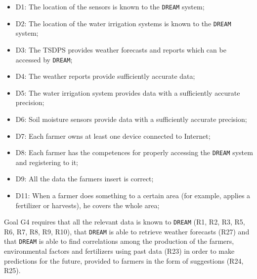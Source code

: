 \documentclass{article}
\begin{document}
\begin{itemize}
    \item D1: The location of the sensors is known to the \verb|DREAM| system;
    
    \item D2: The location of the water irrigation systems is known to the \verb|DREAM| system;
    
    \item D3: The TSDPS provides weather forecasts and reports which can be accessed by \verb|DREAM|;
    
    \item D4: The weather reports provide sufficiently accurate data;
    
    \item D5: The water irrigation system provides data with a sufficiently accurate precision;
    
    \item D6: Soil moisture sensors provide data with a sufficiently accurate precision;
    
    \item D7: Each farmer owns at least one device connected to Internet;
    
    \item D8: Each farmer has the competences for properly accessing the \verb|DREAM| system and registering to it;
    
    \item D9: All the data the farmers insert is correct;
    
    \item D11: When a farmer does something to a certain area (for example, applies a fertilizer or harvests), he covers the whole area;
\end{itemize}
Goal G4 requires that all the relevant data is known to \verb|DREAM| (R1, R2, R3, R5, R6, R7, R8, R9, R10), that \verb|DREAM| is able to retrieve weather forecasts (R27) and that \verb|DREAM| is able to find correlations among the production of the farmers, environmental factors and fertilizers using past data (R23) in order to make predictions for the future, provided to farmers in the form of suggestions (R24, R25).
\end{document}
